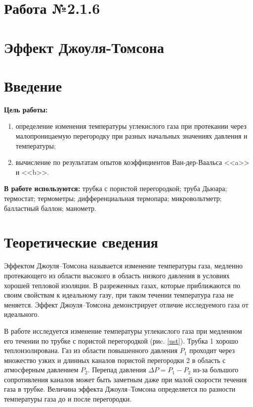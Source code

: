\documentclass[a4paper,12pt]{article} %
\begin{document}
\begin{center}
\section*{Работа №2.1.6}
    \section*{Эффект Джоуля-Томсона}
\end{center}

\section*{Введение}
\textbf{Цель работы:}  
\begin{enumerate}
	\item определение изменения температуры углекислого газа при протекании через малопроницаемую перегородку при разных начальных значениях давления и температуры;
	\item вычисление по результатам опытов коэффициентов Ван-дер-Ваальса <<a>> и <<b>>.
\end{enumerate}

\textbf{В работе используются:} трубка с пористой перегородкой; труба Дьюара; термостат; термометры; дифференциальная термопара; микровольтметр; балластный баллон; манометр.
\section*{Теоретические сведения}

Эффектом Джоуля–Томсона называется изменение температуры газа, медленно протекающего из области высокого в область низкого давления в условиях хорошей тепловой изоляции. В разреженных газах, которые приближаются по своим свойствам к идеальному газу, при таком течении температура газа не меняется. Эффект Джоуля–Томсона демонстрирует отличие исследуемого газа от идеального.

В работе исследуется изменение температуры углекислого газа при медленном его течении по трубке с пористой перегородкой (риc. \ref{ust}). Трубка 1 хорошо теплоизолирована. Газ из области повышенного давления $ P_1 $ проходит через множество узких и длинных каналов пористой перегородки 2 в область с атмосферным давлением $ P_2 $. Перепад давления $ \Delta P = P_1 - P_2 $ из-за большого сопротивления каналов может быть заметным даже при малой скорости течения газа в трубке. Величина эффекта Джоуля–Томсона определяется по разности температуры газа до и после перегородки.
\end{document}
